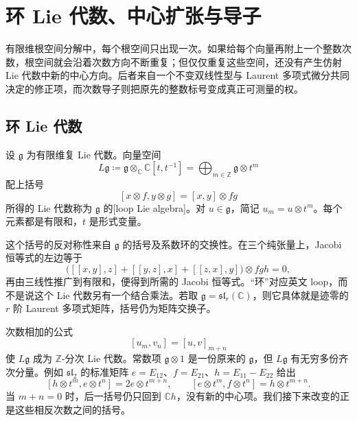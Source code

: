 
\section{环 Lie 代数、中心扩张与导子}
\label{b5:sec:G02}

有限维根空间分解中，每个根空间只出现一次。如果给每个向量再附上一个整数次数，根空间就会沿着次数方向不断重复；但仅仅重复这些空间，还没有产生仿射 Lie 代数中新的中心方向。后者来自一个不变双线性型与 Laurent 多项式微分共同决定的修正项，而次数导子则把原先的整数标号变成真正可测量的权。

\subsection{环 Lie 代数}
\label{b5:subsec:G02:01}

\begin{definition}\label{b5:def:G-loop-algebra}
	设 \(\mathfrak g\) 为有限维复 Lie 代数。向量空间
	\[
		L\mathfrak g\coloneqq\mathfrak g\otimes_{\mathbb C}\mathbb C[t,t^{-1}]
		=\bigoplus_{m\in\mathbb Z}\mathfrak g\otimes t^m
	\]
	配上括号
	\[
		[x\otimes f,y\otimes g]=[x,y]\otimes fg
	\]
	所得的 Lie 代数称为 \(\mathfrak g\) 的[loop Lie algebra]。对 \(u\in\mathfrak g\)，简记 \(u_m=u\otimes t^m\)。每个元素都是有限和，\(t\) 是形式变量。
\end{definition}

这个括号的反对称性来自 \(\mathfrak g\) 的括号及系数环的交换性。在三个纯张量上，Jacobi 恒等式的左边等于
\[
	\bigl([[x,y],z]+[[y,z],x]+[[z,x],y]\bigr)\otimes fgh=0,
\]
再由三线性推广到有限和，便得到所需的 Jacobi 恒等式。“环”对应英文 loop，而不是说这个 Lie 代数另有一个结合乘法。若取 \(\mathfrak g=\mathfrak{sl}_r(\mathbb C)\)，则它具体就是迹零的 \(r\) 阶 Laurent 多项式矩阵，括号仍为矩阵交换子。

\ProseParagraphBreak

次数相加的公式
\[
	[u_m,v_n]=[u,v]_{m+n}
\]
使 \(L\mathfrak g\) 成为 \(\mathbb Z\)-分次 Lie 代数。常数项 \(\mathfrak g\otimes1\) 是一份原来的 \(\mathfrak g\)，但 \(L\mathfrak g\) 有无穷多份齐次分量。例如 \(\mathfrak{sl}_2\) 的标准矩阵 \(e=E_{12}\)、\(f=E_{21}\)、\(h=E_{11}-E_{22}\) 给出
\[
	[h\otimes t^m,e\otimes t^n]=2e\otimes t^{m+n},\qquad
	[e\otimes t^m,f\otimes t^n]=h\otimes t^{m+n}.
\]
当 \(m+n=0\) 时，后一括号仍只回到 \(\mathbb Ch\)，没有新的中心项。我们接下来改变的正是这些相反次数之间的括号。

